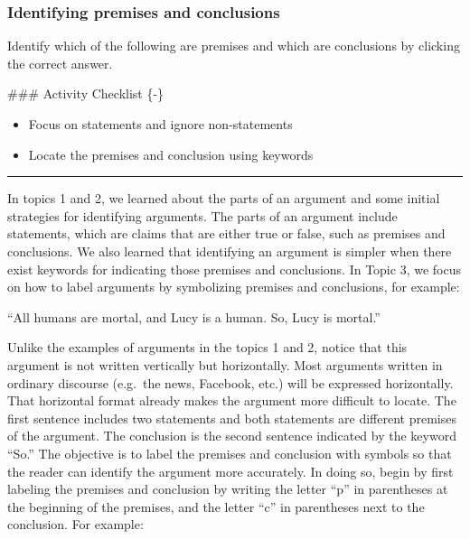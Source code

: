 \documentclass[
]{book}
\begin{document}
\hypertarget{identifying-premises-and-conclusions}{%
\subsubsection*{Identifying premises and conclusions}\label{identifying-premises-and-conclusions}}

\begin{reflect}
Identify which of the following are premises and which are conclusions by clicking the correct answer.
\end{reflect}
\#\#\# Activity Checklist \{-\}

\begin{reflect}
\begin{itemize}
\item
  Focus on statements and ignore non-statements
\item
  Locate the premises and conclusion using keywords
\end{itemize}
\end{reflect}

\begin{center}\rule{0.5\linewidth}{0.5pt}\end{center}

In topics 1 and 2, we learned about the parts of an argument and some initial strategies for identifying arguments. The parts of an argument include statements, which are claims that are either true or false, such as premises and conclusions. We also learned that identifying an argument is simpler when there exist keywords for indicating those premises and conclusions. In Topic 3, we focus on how to label arguments by symbolizing premises and conclusions, for example:

``All humans are mortal, and Lucy is a human. So, Lucy is mortal.''

Unlike the examples of arguments in the topics 1 and 2, notice that this argument is not written vertically but horizontally. Most arguments written in ordinary discourse (e.g.~the news, Facebook, etc.) will be expressed horizontally. That horizontal format already makes the argument more difficult to locate. The first sentence includes two statements and both statements are different premises of the argument. The conclusion is the second sentence indicated by the keyword ``So.'' The objective is to label the premises and conclusion with symbols so that the reader can identify the argument more accurately. In doing so, begin by first labeling the premises and conclusion by writing the letter ``p'' in parentheses at the beginning of the premises, and the letter ``c'' in parentheses next to the conclusion. For example:
\end{document}
